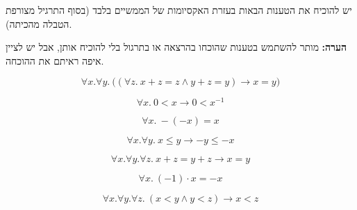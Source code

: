 \documentclass{infi-ex}
\begin{document}
\makeextitle

\begin{instructions}
יש להוכיח את הטענות הבאות בעזרת האקסיומות של הממשיים בלבד (בסוף התרגיל מצורפת הטבלה מהכיתה).

\textbf{הערה:} מותר להשתמש בטענות שהוכחו בהרצאה או בתרגול בלי להוכיח אותן, אבל יש לציין איפה ראיתם את ההוכחה.
\end{instructions}

\begin{question}
\[ \forall x.\forall y.\ \bigl((\forall z.\ x+z=z\land y+z=y)\to x=y\bigr) \]
\end{question}

\begin{question}
\[ \forall x.\ 0<x\to0<x^{-1} \]
\end{question}

\begin{question}
\[ \forall x.\ -(-x)=x \]
\end{question}

\begin{question}
\[ \forall x.\forall y.\ x\le y\to -y\le -x \]
\end{question}

\begin{question}
\[ \forall x.\forall y.\forall z.\ x+z=y+z\to x=y \]
\end{question}

\begin{question}
\[ \forall x.\ (-1)\cdot x=-x \]
\end{question}

\begin{question}[טרנזיטיביות של $<$]
\[ \forall x.\forall y.\forall z.\ (x<y\land y<z)\to x<z \]
\end{question}


\end{document}

